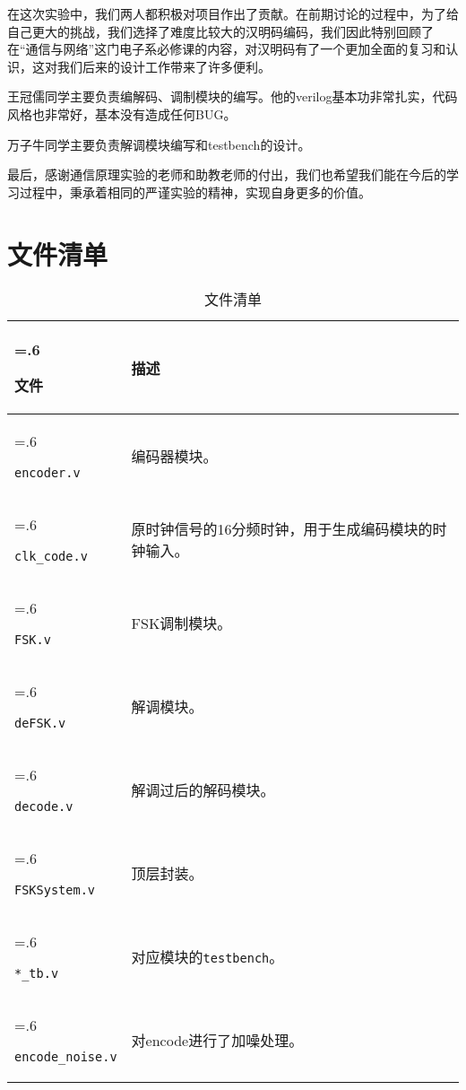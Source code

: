 \documentclass{progartcn}
\begin{document}
在这次实验中，我们两人都积极对项目作出了贡献。在前期讨论的过程中，为了给自己更大的挑战，我们选择了难度比较大的汉明码编码，我们因此特别回顾了在“通信与网络”这门电子系必修课的内容，对汉明码有了一个更加全面的复习和认识，这对我们后来的设计工作带来了许多便利。

王冠儒同学主要负责编解码、调制模块的编写。他的verilog基本功非常扎实，代码风格也非常好，基本没有造成任何BUG。

万子牛同学主要负责解调模块编写和testbench的设计。

最后，感谢通信原理实验的老师和助教老师的付出，我们也希望我们能在今后的学习过程中，秉承着相同的严谨实验的精神，实现自身更多的价值。


\section{文件清单}

\begin{table}[h!]
  \caption{文件清单}\label{table:1}
  \begin{tabularx}{\textwidth}{>{\hsize=.6\hsize\raggedright\arraybackslash}X>{\raggedright\arraybackslash}X}\toprule
    \bfseries{文件} & \bfseries{描述}\\ \midrule
    \verb|encoder.v| & 编码器模块。 \\
    \verb|clk_code.v| & 原时钟信号的16分频时钟，用于生成编码模块的时钟输入。 \\ 
    \verb|FSK.v| & FSK调制模块。 \\
    \verb|deFSK.v| & 解调模块。 \\
    \verb|decode.v| & 解调过后的解码模块。 \\
    \verb|FSKSystem.v| & 顶层封装。 \\
    \verb|*_tb.v| & 对应模块的\verb|testbench|。 \\
    \verb|encode_noise.v| & 对encode进行了加噪处理。 \\
    \bottomrule
  \end{tabularx}
\end{table}
\end{document}
